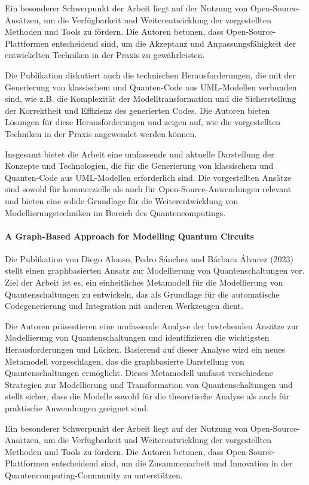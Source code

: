 Ein besonderer Schwerpunkt der Arbeit liegt auf der Nutzung von Open-Source-Ansätzen, um die Verfügbarkeit und 
Weiterentwicklung der vorgestellten Methoden und Tools zu fördern. Die Autoren betonen, dass Open-Source-Plattformen 
entscheidend sind, um die Akzeptanz und Anpassungsfähigkeit der entwickelten Techniken in der Praxis zu gewährleisten.

Die Publikation diskutiert auch die technischen Herausforderungen, die mit der Generierung von klassischem und 
Quanten-Code aus UML-Modellen verbunden sind, wie z.B. die Komplexität der Modelltransformation und die Sicherstellung 
der Korrektheit und Effizienz des generierten Codes. Die Autoren bieten Lösungen für diese Herausforderungen und 
zeigen auf, wie die vorgestellten Techniken in der Praxis angewendet werden können.

Insgesamt bietet die Arbeit eine umfassende und aktuelle Darstellung der Konzepte und Technologien, die für die 
Generierung von klassischem und Quanten-Code aus UML-Modellen erforderlich sind. Die vorgestellten Ansätze sind 
sowohl für kommerzielle als auch für Open-Source-Anwendungen relevant und bieten eine solide Grundlage für die 
Weiterentwicklung von Modellierungstechniken im Bereich des Quantencomputings.

\paragraph{A Graph-Based Approach for Modelling Quantum Circuits}

Die Publikation von Diego Alonso, Pedro Sánchez und Bárbara Álvarez (2023) stellt einen graphbasierten Ansatz zur 
Modellierung von Quantenschaltungen vor. Ziel der Arbeit ist es, ein einheitliches Metamodell für die Modellierung 
von Quantenschaltungen zu entwickeln, das als Grundlage für die automatische Codegenerierung und Integration mit 
anderen Werkzeugen dient.

Die Autoren präsentieren eine umfassende Analyse der bestehenden Ansätze zur Modellierung von Quantenschaltungen 
und identifizieren die wichtigsten Herausforderungen und Lücken. Basierend auf dieser Analyse wird ein neues Metamodell 
vorgeschlagen, das die graphbasierte Darstellung von Quantenschaltungen ermöglicht. Dieses Metamodell umfasst 
verschiedene Strategien zur Modellierung und Transformation von Quantenschaltungen und stellt sicher, dass die 
Modelle sowohl für die theoretische Analyse als auch für praktische Anwendungen geeignet sind.

Ein besonderer Schwerpunkt der Arbeit liegt auf der Nutzung von Open-Source-Ansätzen, um die Verfügbarkeit und 
Weiterentwicklung der vorgestellten Methoden und Tools zu fördern. Die Autoren betonen, dass Open-Source-Plattformen 
entscheidend sind, um die Zusammenarbeit und Innovation in der Quantencomputing-Community zu unterstützen.

